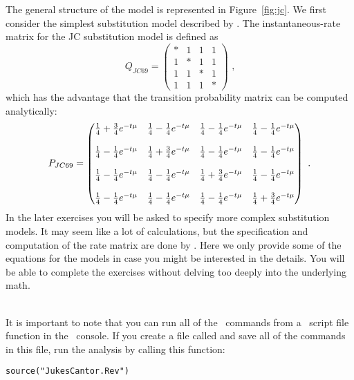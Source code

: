 The general structure of the model is represented in Figure~\ref{fig:jc}.
We first consider the simplest substitution model described by \citet{Jukes1969}.
The instantaneous-rate matrix for the JC substitution model is defined as
\begin{equation*}
Q_{JC69} = \begin{pmatrix} 
{*} & {1} & {1} & {1} \\ 
{1} & {*} & {1} & {1} \\ 
{1} & {1} & {*} & {1} \\ 
{1} & {1} & {1} & {*}  
\end{pmatrix} \mbox{  ,}
\end{equation*}
which has the advantage that the transition probability matrix can be computed analytically:
\begin{equation*}
P_{JC69} = \begin{pmatrix} {{1\over4} + {3\over4}e^{-t\mu}} & {{1\over4} - {1\over4}e^{-t\mu}} & {{1\over4} - {1\over4}e^{-t\mu}} & {{1\over4} - {1\over4}e^{-t\mu}} \\\\ {{1\over4} - {1\over4}e^{-t\mu}} & {{1\over4} + {3\over4}e^{-t\mu}} & {{1\over4} - {1\over4}e^{-t\mu}} & {{1\over4} - {1\over4}e^{-t\mu}} \\\\ {{1\over4} - {1\over4}e^{-t\mu}} & {{1\over4} - {1\over4}e^{-t\mu}} & {{1\over4} + {3\over4}e^{-t\mu}} & {{1\over4} - {1\over4}e^{-t\mu}} \\\\ {{1\over4} - {1\over4}e^{-t\mu}} & {{1\over4} - {1\over4}e^{-t\mu}} & {{1\over4} - {1\over4}e^{-t\mu}} & {{1\over4} + {3\over4}e^{-t\mu}}  
\end{pmatrix} \mbox{  .}
\end{equation*}
In the later exercises you will be asked to specify more complex substitution models.
It may seem like a lot of calculations, but the specification and computation of the rate matrix are done by
\RevBayes.
Here we only provide some of the equations for the models in case you might be interested in the details.
You will be able to complete the exercises without delving too deeply into the underlying math.


\noindent \\ \impmark It is important to note that you can run all of the \Rev~commands from a \RevBayes~script file  function in the \RevBayes~console. If you create a file called  and save all of the commands in this file, run the analysis by calling this function:
{\tt \begin{snugshade*}
\begin{lstlisting}
source("JukesCantor.Rev")
\end{lstlisting}
\end{snugshade*}}

